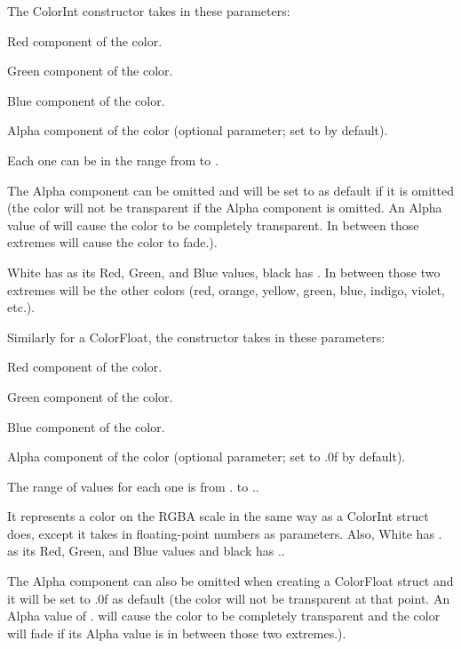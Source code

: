 The {\ttfamily Color\+Int} constructor takes in these parameters\+:


\begin{DoxyItemize}
\item Red component of the color.
\item Green component of the color.
\item Blue component of the color.
\item Alpha component of the color (optional parameter; set to {} by default).
\end{DoxyItemize}

Each one can be in the range from {} to {}.

The Alpha component can be omitted and will be set to {} as default if it is omitted (the color will not be transparent if the Alpha component is omitted. An Alpha value of {} will cause the color to be completely transparent. In between those extremes will cause the color to fade.).

White has {} as its Red, Green, and Blue values, black has {}. In between those two extremes will be the other colors (red, orange, yellow, green, blue, indigo, violet, etc.).

Similarly for a {\ttfamily Color\+Float}, the constructor takes in these parameters\+:


\begin{DoxyItemize}
\item Red component of the color.
\item Green component of the color.
\item Blue component of the color.
\item Alpha component of the color (optional parameter; set to {.\+0f} by default).
\end{DoxyItemize}

The range of values for each one is from {.} to {.}.

It represents a color on the R\+G\+BA scale in the same way as a {\ttfamily Color\+Int} struct does, except it takes in floating-\/point numbers as parameters. Also, White has {.} as its Red, Green, and Blue values and black has {.}.

The Alpha component can also be omitted when creating a {\ttfamily Color\+Float} struct and it will be set to {.\+0f} as default (the color will not be transparent at that point. An Alpha value of {.} will cause the color to be completely transparent and the color will fade if its Alpha value is in between those two extremes.).

